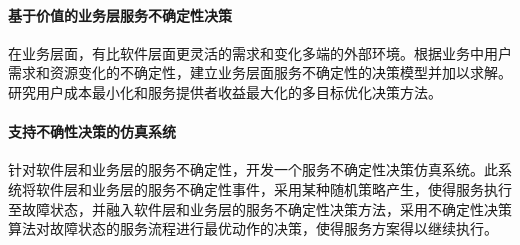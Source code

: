 \paragraph{基于价值的业务层服务不确定性决策}

在业务层面，有比软件层面更灵活的需求和变化多端的外部环境。根据业务中用户需求和资源变化的不确定性，建立业务层面服务不确定性的决策模型并加以求解。研究用户成本最小化和服务提供者收益最大化的多目标优化决策方法。

\paragraph{支持不确性决策的仿真系统}

针对软件层和业务层的服务不确定性，开发一个服务不确定性决策仿真系统。此系统将软件层和业务层的服务不确定性事件，采用某种随机策略产生，使得服务执行至故障状态，并融入软件层和业务层的服务不确定性决策方法，采用不确定性决策算法对故障状态的服务流程进行最优动作的决策，使得服务方案得以继续执行。


%
%
%

